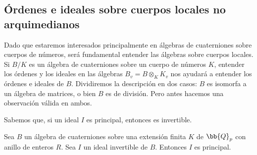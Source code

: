 \subsection{\'{O}rdenes e ideales sobre cuerpos locales no arquimedianos}
Dado que estaremos interesados principalmente en \'{a}lgebras de cuaterniones
sobre cuerpos de n\'{u}meros, ser\'{a} fundamental entender las \'{a}lgebras
sobre cuerpos locales. Si $B/K$ es un \'{a}lgebra de cuaterniones
sobre un cuerpo de n\'{u}meros $K$, entender los \'{o}rdenes y los ideales
en las \'{a}lgebras $B_{v}=B\otimes_{K}K_{v}$ nos ayudar\'{a} a entender
los \'{o}rdenes e ideales de $B$. Dividiremos la descripci\'{o}n en dos
casos: $B$ es isomorfa a un \'{a}lgebra de matrices, o bien $B$ es de
divisi\'{o}n. Pero antes hacemos una observaci\'{o}n v\'{a}lida en ambos.

Sabemos que, si un ideal $I$ es principal, entonces es invertible.

\begin{propoInvertibleImplicaPrincipal}
	Sea $B$ un \'{a}lgebra de cuaterniones sobre una extensi\'{o}n finita
	$K$ de $\bb{Q}_{p}$ con anillo de enteros $R$. Sea $I$ un ideal
	invertible de $B$. Entonces $I$ es principal.
\end{propoInvertibleImplicaPrincipal}


